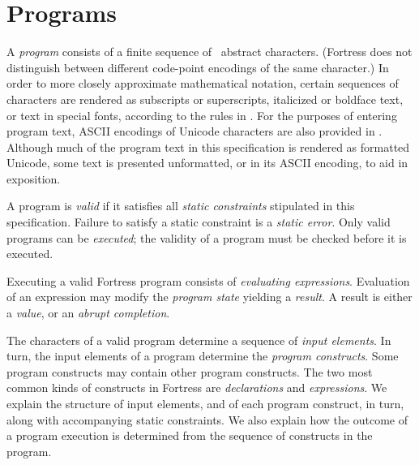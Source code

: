 %
%
%
%

\chapter{Programs}


A \emph{program} consists of a finite sequence of \unicode\
abstract characters.
(Fortress does not distinguish between
different code-point encodings of the same character.)
In order to more closely approximate
mathematical notation, certain sequences of characters are rendered
as subscripts or superscripts, italicized or boldface text, or text in
special fonts, according to the rules in \appref{app-rendering}.
For the purposes of entering program text, ASCII encodings of Unicode
characters are also provided in \appref{ascii-unicode}.
 Although much
of the program text in this specification is rendered as formatted Unicode,
some text is presented unformatted, or in its ASCII encoding,
to aid in exposition.

A program is \emph{valid} if it satisfies all \emph{static constraints}
stipulated in this specification.  Failure to satisfy a static constraint
is a \emph{static error}.  Only valid programs can be \emph{executed}; the
validity of a program must be checked before it is executed.

Executing a valid Fortress program
consists of \emph{evaluating expressions}.
Evaluation of an expression may modify the \emph{program state}
yielding a \emph{result}.
A result is either a \emph{value}, or an \emph{abrupt completion}.


The characters of a valid program determine
a sequence of \emph{input elements}.
In turn,
the input elements of a program
determine the \emph{program constructs}.
Some program constructs may contain other program constructs.
The two most common kinds of constructs in Fortress are
\emph{declarations} and \emph{expressions}.
We explain the structure of input elements, and of each program construct,
in turn, along with accompanying static constraints.
We also explain how the outcome of a program execution is determined from
the sequence of constructs in the program.

